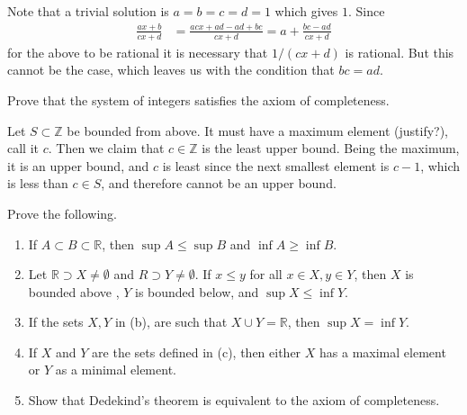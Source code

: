 \documentclass{article}
\begin{document}
    \begin{solution}
    Note that a trivial solution is $a = b = c = d = 1$ which gives $1$. Since 
    \begin{align*}
        \frac{ax + b}{cx + d} & = \frac{acx + ad - ad + bc}{cx + d} = a + \frac{bc - ad}{cx + d} 
    \end{align*}
    for the above to be rational it is necessary that $1/(cx + d)$ is rational. But this cannot be the case, which leaves us with the condition that $bc = ad$. 
    \end{solution}

    \begin{exercise}[Olmsted 1.8]
    Prove that the system of integers satisfies the axiom of completeness. 
    \end{exercise}

    \begin{solution}
    Let $S \subset \mathbb{Z}$ be bounded from above. It must have a maximum element (justify?), call it $c$. Then we claim that $c \in \mathbb{Z}$ is the least upper bound. Being the maximum, it is an upper bound, and $c$ is least since the next smallest element is $c-1$, which is less than $c \in S$, and therefore cannot be an upper bound. 
    \end{solution}

    \begin{exercise}
    Prove the following. 
    \begin{enumerate}
        \item If $A \subset B \subset \mathbb{R}$, then $\sup{A} \leq \sup{B}$ and $\inf{A} \geq \inf{B}$. 
        \item Let $\mathbb{R} \supset X \neq \emptyset$ and $R \supset Y \neq \emptyset$. If $x \leq y$ for all $x \in X, y \in Y$, then $X$ is bounded above , $Y$ is bounded below, and $\sup{X} \leq \inf{Y}$. 
        \item If the sets $X, Y$ in (b), are such that $X \cup Y = \mathbb{R}$, then $\sup{X} = \inf{Y}$. 
        \item If $X$ and $Y$ are the sets defined in (c), then either $X$ has a maximal element or $Y$ as a minimal element. 
        \item Show that Dedekind's theorem is equivalent to the axiom of completeness. 
    \end{enumerate}
    \end{exercise}
\end{document}
